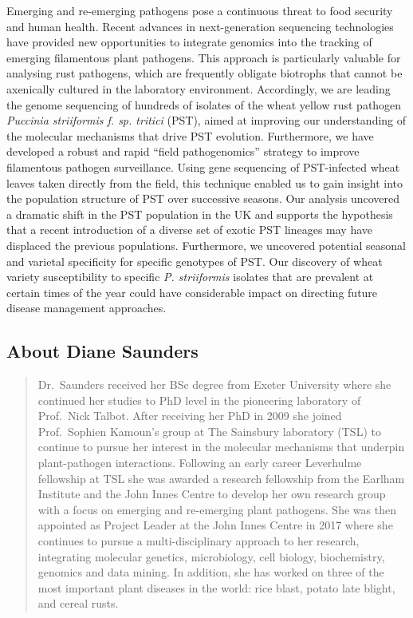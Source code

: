 \documentclass[12pt,]{book}
\theoremstyle{definition}
\theoremstyle{definition}
\theoremstyle{remark}
\begin{document}
Emerging and re-emerging pathogens pose a continuous threat to food
security and human health. Recent advances in next-generation sequencing
technologies have provided new opportunities to integrate genomics into
the tracking of emerging filamentous plant pathogens. This approach is
particularly valuable for analysing rust pathogens, which are frequently
obligate biotrophs that cannot be axenically cultured in the laboratory
environment. Accordingly, we are leading the genome sequencing of
hundreds of isolates of the wheat yellow rust pathogen \emph{Puccinia
striiformis f. sp. tritici} (PST), aimed at improving our understanding
of the molecular mechanisms that drive PST evolution. Furthermore, we
have developed a robust and rapid ``field pathogenomics'' strategy to
improve filamentous pathogen surveillance. Using gene sequencing of
PST-infected wheat leaves taken directly from the field, this technique
enabled us to gain insight into the population structure of PST over
successive seasons. Our analysis uncovered a dramatic shift in the PST
population in the UK and supports the hypothesis that a recent
introduction of a diverse set of exotic PST lineages may have displaced
the previous populations. Furthermore, we uncovered potential seasonal
and varietal specificity for specific genotypes of PST. Our discovery of
wheat variety susceptibility to specific \emph{P. striiformis} isolates
that are prevalent at certain times of the year could have considerable
impact on directing future disease management approaches.

\subsection*{About Diane Saunders}\label{about-diane-saunders}

\begin{quote}
Dr.~Saunders received her BSc degree from Exeter University where she
continued her studies to PhD level in the pioneering laboratory of
Prof.~Nick Talbot. After receiving her PhD in 2009 she joined
Prof.~Sophien Kamoun's group at The Sainsbury laboratory (TSL) to
continue to pursue her interest in the molecular mechanisms that
underpin plant-pathogen interactions. Following an early career
Leverhulme fellowship at TSL she was awarded a research fellowship from
the Earlham Institute and the John Innes Centre to develop her own
research group with a focus on emerging and re-emerging plant pathogens.
She was then appointed as Project Leader at the John Innes Centre in
2017 where she continues to pursue a multi-disciplinary approach to her
research, integrating molecular genetics, microbiology, cell biology,
biochemistry, genomics and data mining. In addition, she has worked on
three of the most important plant diseases in the world: rice blast,
potato late blight, and cereal rusts.
\end{quote}
\end{document}
